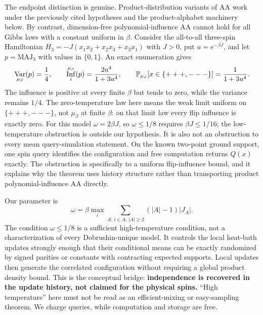 \documentclass[11pt]{article}
\theoremstyle{definition}\newtheorem{definition}[theorem]{Definition}
\theoremstyle{remark}\newtheorem{remark}[theorem]{Remark}
\DeclareMathOperator{\Inf}{Inf}\DeclareMathOperator{\Var}{Var}
\begin{document}
The endpoint distinction is genuine. Product-distribution variants of AA work under the previously cited hypotheses and the product-alphabet machinery below. By contrast, dimension-free polynomial-influence AA cannot hold for all Gibbs laws with a constant uniform in \(\beta\). Consider the all-to-all three-spin Hamiltonian \(H_3=-J(x_1x_2+x_2x_3+x_3x_1)\) with \(J>0\), put \(u=e^{-\beta J}\), and let \(p=\mathrm{MAJ}_3\) with values in \(\{0,1\}\). An exact enumeration gives
\[
 \Var_{\mu_\beta}(p)=\frac14,\qquad
 \Inf_i^{\mu_\beta}(p)=\frac{2u^4}{1+3u^4},\qquad
 \Prb_{\mu_\beta}[x\in\{+++,---\}]=\frac1{1+3u^4}.
\]
The influence is positive at every finite \(\beta\) but tends to zero, while the variance remains \(1/4\). The zero-temperature law here means the weak limit uniform on \(\{+++,---\}\), not \(\mu_\beta\) at finite \(\beta\): on that limit law every flip influence is exactly zero. For this model \(\omega=2\beta J\), so \(\omega\le1/8\) requires \(\beta J\le1/16\); the low-temperature obstruction is outside our hypothesis. It is also not an obstruction to every mean query-simulation statement. On the known two-point ground support, one spin query identifies the configuration and free computation returns \(Q(x)\) exactly. The obstruction is specifically to a uniform flip-influence bound, and it explains why the theorem uses history structure rather than transporting product polynomial-influence AA directly.

Our parameter is
\[
 \omega=\beta\max_i\sum_{A:\,i\in A,\,|A|\ge2}(|A|-1)|J_A|.
\]
The condition \(\omega\le1/8\) is a sufficient high-temperature condition, not a characterization of every Dobrushin-unique model. It controls the local heat-bath updates strongly enough that their conditional means can be exactly randomized by signed parities or constants with contracting expected supports. Local updates then generate the correlated configuration without requiring a global product density bound. This is the conceptual bridge: \textbf{independence is recovered in the update history, not claimed for the physical spins.} ``High temperature'' here must not be read as an efficient-mixing or easy-sampling theorem. We charge queries, while computation and storage are free.
\end{document}
